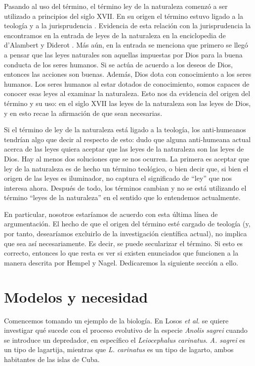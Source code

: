 Pasando al uso del término, el término ley de la naturaleza comenzó a ser utilizado a principios del siglo XVII. En su origen el término estuvo ligado a la teología y a la jurisprudencia \cite{Giere2006, Giere1999}. Evidencia de esta relación con la jurisprudencia la encontramos en la entrada de leyes de la naturaleza en la enciclopedia de d'Alambert y Diderot \cite{lawna}. Más aún, en la entrada se menciona que primero se llegó a pensar que las leyes naturales son aquellas impuestas por Dios para la buena conducta de los seres humanos. Si se actúa de acuerdo a los deseos de Dios, entonces las acciones son buenas. Además, Dios dota con conocimiento a los seres humanos. Los seres humanos al estar dotados de conocimiento, somos capaces de conocer esas leyes al examinar la naturaleza. Esto nos da evidencia del origen del término y su uso: en el siglo XVII las leyes de la naturaleza son las leyes de Dios, y en esto recae la afirmación de que sean necesarias.

Si el término de ley de la naturaleza está ligado a la teología, los anti-humeanos tendrían algo que decir al respecto de esto: dudo que alguna anti-humeana actual acerca de las leyes quiera aceptar que las leyes de la naturaleza son las leyes de Dios. Hay al menos dos soluciones que se nos ocurren. La primera es aceptar que ley de la naturaleza es de hecho un término teológico, o bien decir que, si bien el origen de las leyes es iluminador, no captura el significado de ``ley'' que nos interesa ahora. Después de todo, los términos cambian y no se está utilizando el término ``leyes de la naturaleza'' en el sentido que lo entendemos actualmente.

En particular, nosotros estaríamos de acuerdo con esta última línea de argumentación. El hecho de que el origen del término esté cargado de teología (y, por tanto, desearíamos excluirlo de la investigación científica actual), no implica que sea así necesariamente. Es decir, se puede secularizar el término. Si esto es correcto, entonces lo que resta es ver si existen enunciados que funcionen a la manera descrita por Hempel y Nagel. Dedicaremos la siguiente sección a ello.

\section{Modelos y necesidad}

\noindent Comencemos tomando un ejemplo de la biología. En Losos \emph{et al.}\citeyear{Losos2004} se quiere investigar qué sucede con el proceso evolutivo de la especie \textit{Anolis sagrei} cuando se introduce un depredador, en específico el \textit{Leiocephalus carinatus}. \textit{A. sagrei}  es un tipo de lagartija, mientras que \textit{L. carinatus} es un tipo de lagarto, ambos habitantes de las islas de Cuba.


